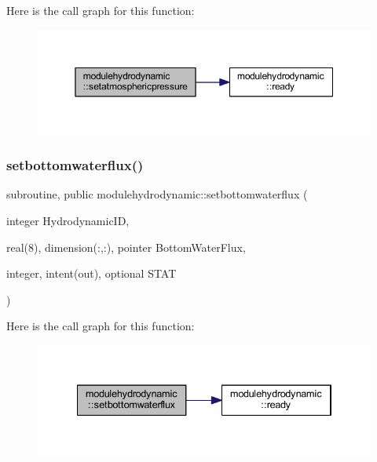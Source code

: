 Here is the call graph for this function\+:\nopagebreak
\begin{figure}[H]
\begin{center}
\leavevmode
\includegraphics[width=350pt]{namespacemodulehydrodynamic_ab767a1bf58d41f86c6b2ab58684d962d_cgraph}
\end{center}
\end{figure}
\mbox{\label{namespacemodulehydrodynamic_ab2050ec05277d36366cce71907994973}} 
\subsubsection{\texorpdfstring{setbottomwaterflux()}{setbottomwaterflux()}}
{\footnotesize\ttfamily subroutine, public modulehydrodynamic\+::setbottomwaterflux (\begin{DoxyParamCaption}\item[{integer}]{Hydrodynamic\+ID,  }\item[{real(8), dimension(\+:,\+:), pointer}]{Bottom\+Water\+Flux,  }\item[{integer, intent(out), optional}]{S\+T\+AT }\end{DoxyParamCaption})}

Here is the call graph for this function\+:\nopagebreak
\begin{figure}[H]
\begin{center}
\leavevmode
\includegraphics[width=334pt]{namespacemodulehydrodynamic_ab2050ec05277d36366cce71907994973_cgraph}
\end{center}
\end{figure}
\mbox{\label{namespacemodulehydrodynamic_a62a3231781314de8d69f6f4216245361}} 
